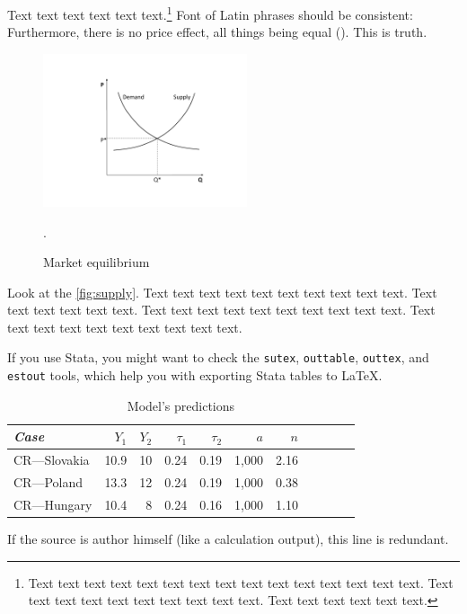 Text text text text text text.\footnote{Text text text text text text text text text text text text text text text. Text text text text text text text text text text. Text text text text text text.} Font of Latin phrases should be consistent: Furthermore, there is no  price effect, all things being equal (). This is  truth.

\begin{figure}[!htbp]
\begin{center}
\caption{Market equilibrium}
\label{fig:supply}
\includegraphics[width=60mm]{Figures/supplydemand}
\end{center}\vspace{-0.5cm}
\begin{source}\cite{Haufler2006}.\end{source}
\end{figure}

Look at the \autoref{fig:supply}. Text text text text text text text text text text. Text text text text text text. Text text text text text text text text text text. Text text text text text text text text text text.





If you use Stata, you might want to check the \texttt{sutex}, \texttt{outtable}, \texttt{outtex}, and \texttt{estout} tools, which help you with exporting Stata tables to \LaTeX{}.


\begin{table}[!htbp]
\begin{center}
	\caption[Calibration table]{Model's predictions}\label{tab:values}
\begin{tabular}{lrrrrrrrrrr}
\toprule
\textit{Case} &        $Y_1$ &        $Y_2$ &  $\tau_1$ &  $\tau_2$ &          $a$ &          $n$\\
\midrule
CR---Slovakia &       10.9 &         10 &       0.24 &       0.19 &          1,000 &       2.16\\

CR---Poland &       13.3 &         12 &       0.24 &       0.19 &          1,000 &       0.38\\

CR---Hungary &       10.4 &          8 &       0.24 &       0.16 &          1,000 &        1.10\\
\bottomrule
\end{tabular}  
\end{center}
\begin{source} If the source is author himself (like a calculation output), this line is redundant.\end{source}
\end{table}

